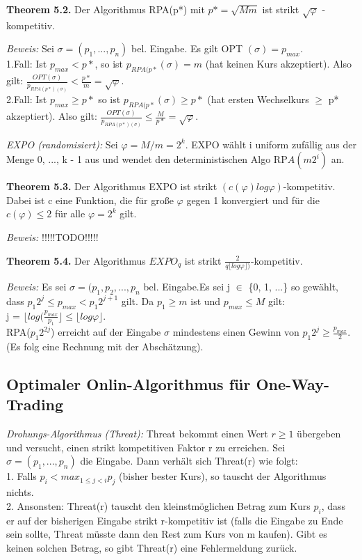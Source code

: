 \textbf{Theorem 5.2.} Der Algorithmus RPA(p*) mit $p* = \sqrt{Mm}$ ist strikt $\sqrt{\varphi}$ - kompetitiv.

\textit{Beweis:} Sei $\sigma = (p_{1}, ..., p_{n})$ bel. Eingabe. Es gilt OPT $(\sigma) = p_{max}$. \\
1.Fall: Ist $p_{max} < p*$, so ist $p_{RPA(p*}(\sigma) = m$ (hat keinen Kurs akzeptiert). Also gilt: $\tfrac{OPT(\sigma)}{p_{RPA(p*)(\sigma)}} < \tfrac{p*}{m} = \sqrt{\varphi}$.\\
2.Fall: Ist $p_{max} \ge p*$ so ist $p_{RPA(p*}(\sigma) \ge p*$ (hat ersten Wechselkurs $\ge$ p* akzeptiert). Also gilt: $\tfrac{OPT(\sigma)}{p_{RPA(p*)(\sigma)}} \le \tfrac{M}{p*} = \sqrt{\varphi}$.

\textit{EXPO (randomisiert):} Sei $\varphi = M / m = 2^k$. EXPO wählt i uniform zufällig aus der Menge {0, ..., k - 1} aus und wendet den deterministischen Algo RP$A(m2^{i})$ an.

\textbf{Theorem 5.3.} Der Algorithmus EXPO ist strikt $(c(\varphi)log\varphi)$-kompetitiv. Dabei ist c eine Funktion, die für große $\varphi$ gegen 1 konvergiert und für die $c(\varphi) \le 2$ für alle $\varphi = 2^k$ gilt.

\textit{Beweis:} !!!!!TODO!!!!!

\textbf{Theorem 5.4.} Der Algorithmus $EXPO_{q}$ ist strikt $\tfrac{2}{q\lfloor log\varphi \rfloor)}$-kompetitiv.

\textit{Beweis:} Es sei $\sigma = (p_{1}, p_{2}, ..., p_{n}$ bel. Eingabe.Es sei j $\in$ \{0, 1, ...\} so gewählt, dass $p_{1}2^{j} \le p_{max} < p_{1}2^{j+1}$ gilt. Da $p_{1} \ge m$ ist und $p_{max} \le M$ gilt: \\
j = $\lfloor log(\tfrac{p_{max}}{p_{1}} \rfloor \le \lfloor log \varphi \rfloor$. \\
RPA($p_{1}2^{2j}$) erreicht auf der Eingabe $\sigma$ mindestens einen Gewinn von $p_{1}2^{j} \ge \tfrac{p_{max}}{2}$. (Es folg eine Rechnung mit der Abschätzung).

\subsection{Optimaler Onlin-Algorithmus für One-Way-Trading}

\textit{Drohungs-Algorithmus (Threat):} Threat bekommt einen Wert $r \ge 1$ übergeben und versucht, einen strikt kompetitiven Faktor r zu erreichen. Sei $\sigma = (p_{1}, ..., p_{n})$ die Eingabe. Dann verhält sich Threat(r) wie folgt:\\
1. Falls $p_{i} < max_{1 \le j < i}p_{j}$ (bisher bester Kurs), so tauscht der Algorithmus nichts.\\
2. Ansonsten: Threat(r) tauscht den kleinstmöglichen Betrag zum Kurs $p_{i}$, dass er auf der bisherigen Eingabe strikt r-kompetitiv ist (falls die Eingabe zu Ende sein sollte, Threat müsste dann den Rest zum Kurs von m kaufen). Gibt es keinen solchen Betrag, so gibt Threat(r) eine Fehlermeldung zurück.


